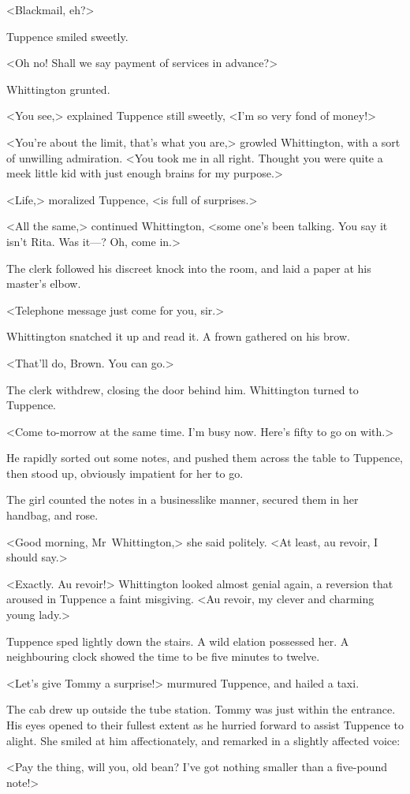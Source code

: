 <Blackmail, eh?>

Tuppence smiled sweetly.

<Oh no! Shall we say payment of services in advance?>

Whittington grunted.

<You see,> explained Tuppence still sweetly, <I'm so very fond of money!>

<You're about the limit, that's what you are,> growled Whittington, with a sort of unwilling admiration. <You took me in all right. Thought you were quite a meek little kid with just enough brains for my purpose.>

<Life,> moralized Tuppence, <is full of surprises.>

<All the same,> continued Whittington, <some one's been talking. You say it isn't Rita. Was it—? Oh, come in.>

The clerk followed his discreet knock into the room, and laid a paper at his master's elbow.

<Telephone message just come for you, sir.>

Whittington snatched it up and read it. A frown gathered on his brow.

<That'll do, Brown. You can go.>

The clerk withdrew, closing the door behind him. Whittington turned to Tuppence.

<Come to-morrow at the same time. I'm busy now. Here's fifty to go on with.>

He rapidly sorted out some notes, and pushed them across the table to Tuppence, then stood up, obviously impatient for her to go.

The girl counted the notes in a businesslike manner, secured them in her handbag, and rose.

<Good morning, Mr~Whittington,> she said politely. <At least, au revoir, I should say.>

<Exactly. Au revoir!> Whittington looked almost genial again, a reversion that aroused in Tuppence a faint misgiving. <Au revoir, my clever and charming young lady.>

Tuppence sped lightly down the stairs. A wild elation possessed her. A neighbouring clock showed the time to be five minutes to twelve.

<Let's give Tommy a surprise!> murmured Tuppence, and hailed a taxi.

The cab drew up outside the tube station. Tommy was just within the entrance. His eyes opened to their fullest extent as he hurried forward to assist Tuppence to alight. She smiled at him affectionately, and remarked in a slightly affected voice:

<Pay the thing, will you, old bean? I've got nothing smaller than a five-pound note!> 